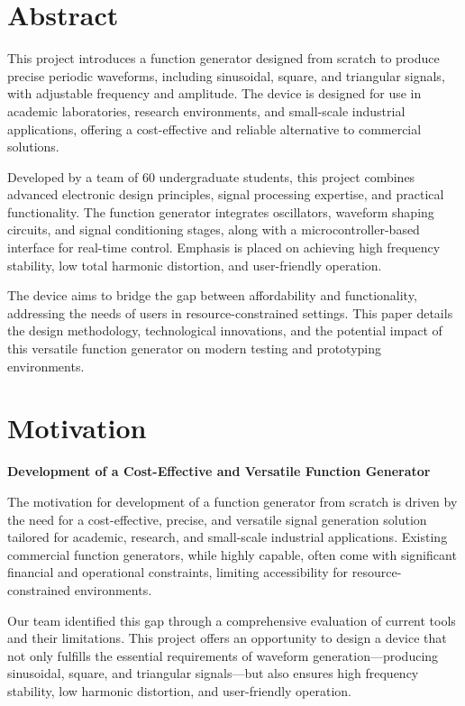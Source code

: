 \documentclass[a4paper,12pt]{article}
\begin{document}
\newpage
\section{Abstract}
This project introduces a function generator designed from scratch to produce precise periodic waveforms, including sinusoidal, square, and triangular signals, with adjustable frequency and amplitude. The device is designed for use in academic laboratories, research environments, and small-scale industrial applications, offering a cost-effective and reliable alternative to commercial solutions.

Developed by a team of 60 undergraduate students, this project combines advanced electronic design principles, signal processing expertise, and practical functionality. The function generator integrates oscillators, waveform shaping circuits, and signal conditioning stages, along with a microcontroller-based interface for real-time control. Emphasis is placed on achieving high frequency stability, low total harmonic distortion, and user-friendly operation.

The device aims to bridge the gap between affordability and functionality, addressing the needs of users in resource-constrained settings. This paper details the design methodology, technological innovations, and the potential impact of this versatile function generator on modern testing and prototyping environments.



\newpage
\section{Motivation}
{\large\textbf{Development of a Cost-Effective and Versatile Function Generator}\par}

The motivation for development of a function generator from scratch is driven by the need for a cost-effective, precise, and versatile signal generation solution tailored for academic, research, and small-scale industrial applications. Existing commercial function generators, while highly capable, often come with significant financial and operational constraints, limiting accessibility for resource-constrained environments.

Our team identified this gap through a comprehensive evaluation of current tools and their limitations. This project offers an opportunity to design a device that not only fulfills the essential requirements of waveform generation—producing sinusoidal, square, and triangular signals—but also ensures high frequency stability, low harmonic distortion, and user-friendly operation.
\end{document}
